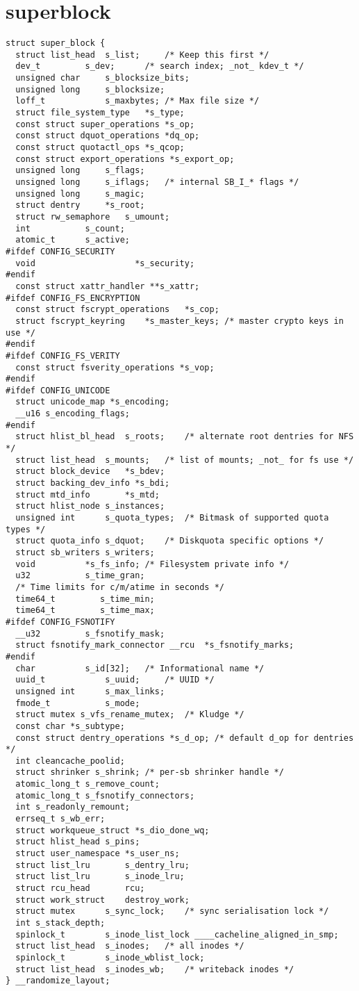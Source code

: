 \section{superblock}
\begin{lstlisting}
struct super_block {
  struct list_head	s_list;		/* Keep this first */
  dev_t			s_dev;		/* search index; _not_ kdev_t */
  unsigned char		s_blocksize_bits;
  unsigned long		s_blocksize;
  loff_t			s_maxbytes;	/* Max file size */
  struct file_system_type	*s_type;
  const struct super_operations	*s_op;
  const struct dquot_operations	*dq_op;
  const struct quotactl_ops	*s_qcop;
  const struct export_operations *s_export_op;
  unsigned long		s_flags;
  unsigned long		s_iflags;	/* internal SB_I_* flags */
  unsigned long		s_magic;
  struct dentry		*s_root;
  struct rw_semaphore	s_umount;
  int			s_count;
  atomic_t		s_active;
#ifdef CONFIG_SECURITY
  void                    *s_security;
#endif
  const struct xattr_handler **s_xattr;
#ifdef CONFIG_FS_ENCRYPTION
  const struct fscrypt_operations	*s_cop;
  struct fscrypt_keyring	*s_master_keys; /* master crypto keys in use */
#endif
#ifdef CONFIG_FS_VERITY
  const struct fsverity_operations *s_vop;
#endif
#ifdef CONFIG_UNICODE
  struct unicode_map *s_encoding;
  __u16 s_encoding_flags;
#endif
  struct hlist_bl_head	s_roots;	/* alternate root dentries for NFS */
  struct list_head	s_mounts;	/* list of mounts; _not_ for fs use */
  struct block_device	*s_bdev;
  struct backing_dev_info *s_bdi;
  struct mtd_info		*s_mtd;
  struct hlist_node	s_instances;
  unsigned int		s_quota_types;	/* Bitmask of supported quota types */
  struct quota_info	s_dquot;	/* Diskquota specific options */
  struct sb_writers	s_writers;
  void			*s_fs_info;	/* Filesystem private info */
  u32			s_time_gran;
  /* Time limits for c/m/atime in seconds */
  time64_t		   s_time_min;
  time64_t		   s_time_max;
#ifdef CONFIG_FSNOTIFY
  __u32			s_fsnotify_mask;
  struct fsnotify_mark_connector __rcu	*s_fsnotify_marks;
#endif
  char			s_id[32];	/* Informational name */
  uuid_t			s_uuid;		/* UUID */
  unsigned int		s_max_links;
  fmode_t			s_mode;
  struct mutex s_vfs_rename_mutex;	/* Kludge */
  const char *s_subtype;
  const struct dentry_operations *s_d_op; /* default d_op for dentries */
  int cleancache_poolid;
  struct shrinker s_shrink;	/* per-sb shrinker handle */
  atomic_long_t s_remove_count;
  atomic_long_t s_fsnotify_connectors;
  int s_readonly_remount;
  errseq_t s_wb_err;
  struct workqueue_struct *s_dio_done_wq;
  struct hlist_head s_pins;
  struct user_namespace *s_user_ns;
  struct list_lru		s_dentry_lru;
  struct list_lru		s_inode_lru;
  struct rcu_head		rcu;
  struct work_struct	destroy_work;
  struct mutex		s_sync_lock;	/* sync serialisation lock */
  int s_stack_depth;
  spinlock_t		s_inode_list_lock ____cacheline_aligned_in_smp;
  struct list_head	s_inodes;	/* all inodes */
  spinlock_t		s_inode_wblist_lock;
  struct list_head	s_inodes_wb;	/* writeback inodes */
} __randomize_layout;
\end{lstlisting}
